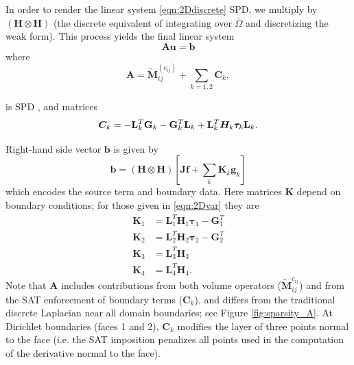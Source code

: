 In order to render the linear system \eqref{eqn:2Ddiscrete} SPD, we multiply by $\left(\boldsymbol{H} \otimes \boldsymbol{H}\right)$ (the discrete equivalent of integrating over $\bar\Omega$ and discretizing the weak form). This process yields the final linear system 
\begin{equation}\label{eqn: final}
   \boldsymbol{A} \boldsymbol{u} = {\boldsymbol{b}} 
\end{equation} where
\begin{equation}\label{eqn:discrete}
\boldsymbol{A} = \tilde{\boldsymbol{M}}^{(c_{ij})}_{ij} + \sum_{k = 1, 2} \boldsymbol{C}_k,
\end{equation}
%

is SPD \citep{Erickson2022}, and matrices
\begin{equation}
    \boldsymbol{C}_k = -{\bf L}_k^T {\bf G}_k - {\bf G}_k^T {\bf L}_k + {\bf L}_k^T \boldsymbol{H}_k \boldsymbol{\tau}_k {\bf L}_k.
\end{equation}

Right-hand side vector $\boldsymbol{b}$ is given by
\begin{equation}
   {\boldsymbol{b}} = \left(\boldsymbol{H} \otimes \boldsymbol{H} \right)\left[\boldsymbol{J}\boldsymbol{f} + \sum_k \boldsymbol{K}_k \boldsymbol{g}_{k}\right]
\end{equation}
which encodes the source term and boundary data.  Here matrices $\boldsymbol{K}$ depend on boundary conditions; for those given in \eqref{eqn:2Dvar} they are
\begin{align}
    \boldsymbol{K}_1 &= \boldsymbol{L}_1^T  \boldsymbol{H}_1  {\boldsymbol\tau}_1 - \boldsymbol{G}_1^T \\
 \boldsymbol{K}_2 &= \boldsymbol{L}_2^T  \boldsymbol{H}_2  {\boldsymbol\tau}_2 - \boldsymbol{G}_2^T \\
  \boldsymbol{K}_3 &= \boldsymbol{L}_3^T \boldsymbol{H}_3\\
    \boldsymbol{K}_4 &= \boldsymbol{L}_4^T \boldsymbol{H}_4.
\end{align}
 Note that $\boldsymbol{A}$ includes contributions from both volume operators ($\tilde{\boldsymbol{M}}^{c_{ij}}_{ij}$) and from the SAT enforcement of boundary terms ($\boldsymbol{C}_k$), and differs from the traditional discrete Laplacian near all domain boundaries; see Figure \ref{fig:sparsity_A}. At Dirichlet boundaries (faces 1 and 2), $\boldsymbol{C}_k$ modifies the layer of three points normal to the face (i.e. the SAT imposition penalizes all points used in the computation of the derivative normal to the face).
